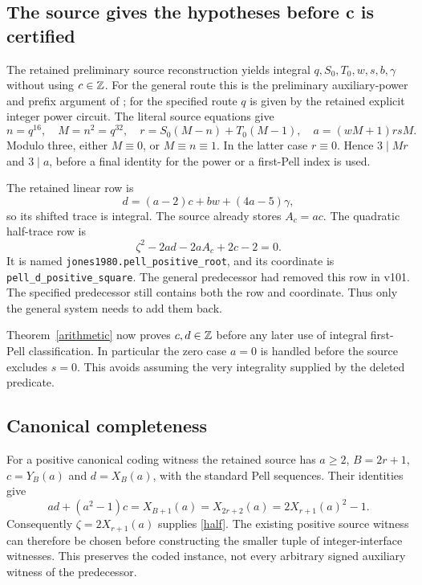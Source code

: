 \documentclass[11pt]{article}
\begin{document}
\subsection{The source gives the hypotheses before c is certified}

The retained preliminary source reconstruction yields integral
$q,S_0,T_0,w,s,b,\gamma$ without using $c\in\mathbb Z$.
For the general route this is the preliminary auxiliary-power and
prefix argument of \cite[Section~2]{signed}; for the specified
route $q$ is given by the retained explicit integer power circuit.
The literal source equations give
\[
 n=q^{16},\quad M=n^2=q^{32},\quad
 r=S_0(M-n)+T_0(M-1),\quad
 a=(wM+1)rsM.
\]
Modulo three, either $M\equiv0$, or $M\equiv n\equiv1$.
In the latter case $r\equiv0$. Hence $3\mid Mr$ and $3\mid a$,
before a final identity for the power or a first-Pell index is used.

The retained linear row is
\[
                    d=(a-2)c+bw+(4a-5)\gamma,
\]
so its shifted trace is integral. The source already stores
$A_c=ac$. The quadratic half-trace row is
\begin{equation}\label{half}
             \zeta^2-2ad-2aA_c+2c-2=0.
\end{equation}
It is named \texttt{jones1980.pell\_positive\_root}, and its
coordinate is \texttt{pell\_d\_positive\_square}.
The general predecessor had removed this row in v101.
The specified predecessor still contains both the row and coordinate.
Thus only the general system needs to add them back.

Theorem~\ref{arithmetic} now proves $c,d\in\mathbb Z$ before any later
use of integral first-Pell classification. In particular the
zero case $a=0$ is handled before the source excludes $s=0$.
This avoids assuming the very integrality supplied by the deleted
predicate.

\subsection{Canonical completeness}

For a positive canonical coding witness the retained source has
$a\ge2$, $B=2r+1$, $c=Y_B(a)$ and $d=X_B(a)$, with the
standard Pell sequences. Their identities give
\[
 ad+(a^2-1)c=X_{B+1}(a)
            =X_{2r+2}(a)=2X_{r+1}(a)^2-1.
\]
Consequently $\zeta=2X_{r+1}(a)$ supplies \eqref{half}.
The existing positive source witness can therefore be chosen
before constructing the smaller tuple of integer-interface
witnesses. This preserves the coded instance, not every
arbitrary signed auxiliary witness of the predecessor.
\end{document}
